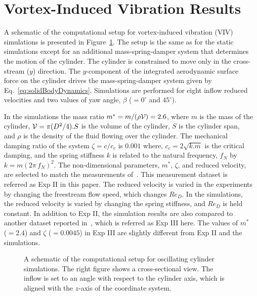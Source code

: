 \section{Vortex-Induced Vibration Results}
\label{sec:VIV}
%
A schematic of the computational setup for vortex-induced vibration (VIV)
simulations is presented in Figure~\ref{fig:VIVmodel}. The setup is the same as
for the static simulations except for an additional mass-spring-damper system
that determines the motion of the cylinder. The cylinder is constrained to move
only in the cross-stream ($y$) direction. The $y$-component of the integrated
aerodynamic surface force on the cylinder drives the mass-spring-damper system
given by Eq.~\ref{eq:solidBodyDynamics}. Simulations are performed for eight
inflow reduced velocities and two values of yaw angle, $\beta$ ($=0^\circ$ and
$45^\circ$).
 
In the simulations the mass ratio $m^*=m/(\rho {\cal V})=2.6$, where $m$ is the
mass of the cylinder, ${\cal V}=\pi (D^2/4) . S$ is the volume of the cylinder,
$S$ is the cylinder span, and $\rho$ is the density of the fluid flowing over
the cylinder. The mechanical damping ratio of the system $\zeta = c/c_c$ is
$0.001$ where, $c_c=2\sqrt{k.m}$ is the critical damping, and the spring
stiffness $k$ is related to the natural frequency, $f_N$ by $k=m(2\pi\,f_N)^2$.
The non-dimensional parameters, $m^*$, $\zeta$, and reduced velocity, are
selected to match the measurements of~\citet{franzini2013one}. This measurement
dataset is referred as Exp II in this paper. The reduced velocity is varied in
the experiments by changing the freestream flow speed, which changes $Re_D$.
In the simulations, the reduced velocity is varied by changing the spring
stiffness, and $Re_D$ is held constant. In addition to Exp II, the simulation
results are also compared to another dataset reported
in~\cite{khalak1997fluid}, which is referred as Exp III here. The values of
$m^*$ ($=2.4$) and $\zeta$ ($=0.0045$) in Exp III are slightly different from
Exp II and the simulations. 
%
\begin{figure}[htb!]
  \caption{A schematic of the computational setup for oscillating cylinder
    simulations. The right figure shows a cross-sectional view. The inflow is set
    to an angle with respect to the cylinder axis, which is aligned with the
    $z$-axis of the coordinate system.}
  \label{fig:VIVmodel}
\end{figure}

